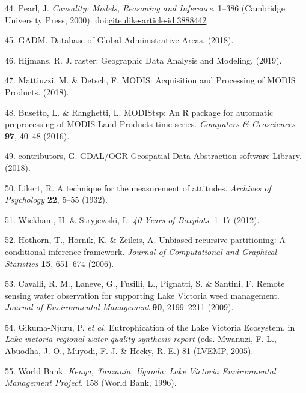 \documentclass[12pt,oneside]{article}
\begin{document}
\leavevmode\hypertarget{ref-Pearl_2000}{}%
44. Pearl, J. \emph{Causality: Models, Reasoning and Inference}. 1--386 (Cambridge University Press, 2000). doi:\href{https://doi.org/citeulike-article-id:3888442}{citeulike-article-id:3888442}

\leavevmode\hypertarget{ref-GADM_2018}{}%
45. GADM. Database of Global Administrative Areas. (2018).

\leavevmode\hypertarget{ref-Hijmans_2019}{}%
46. Hijmans, R. J. raster: Geographic Data Analysis and Modeling. (2019).

\leavevmode\hypertarget{ref-Mattiuzzi_and_Detsch_2018}{}%
47. Mattiuzzi, M. \& Detsch, F. MODIS: Acquisition and Processing of MODIS Products. (2018).

\leavevmode\hypertarget{ref-Busetto_and_ranghetti_2016}{}%
48. Busetto, L. \& Ranghetti, L. MODIStsp: An R package for automatic preprocessing of MODIS Land Products time series. \emph{Computers \& Geosciences} \textbf{97}, 40--48 (2016).

\leavevmode\hypertarget{ref-GDAL_OGRcontributors_2018}{}%
49. contributors, G. GDAL/OGR Geospatial Data Abstraction software Library. (2018).

\leavevmode\hypertarget{ref-Likert_1932}{}%
50. Likert, R. A technique for the measurement of attitudes. \emph{Archives of Psychology} \textbf{22}, 5--55 (1932).

\leavevmode\hypertarget{ref-Wickham_and_Stryjewski_2012}{}%
51. Wickham, H. \& Stryjewski, L. \emph{40 Years of Boxplots}. 1--17 (2012).

\leavevmode\hypertarget{ref-Hothorn_et_al_2006}{}%
52. Hothorn, T., Hornik, K. \& Zeileis, A. Unbiased recursive partitioning: A conditional inference framework. \emph{Journal of Computational and Graphical Statistics} \textbf{15}, 651--674 (2006).

\leavevmode\hypertarget{ref-Cavalli_et_al_2009}{}%
53. Cavalli, R. M., Laneve, G., Fusilli, L., Pignatti, S. \& Santini, F. Remote sensing water observation for supporting Lake Victoria weed management. \emph{Journal of Environmental Management} \textbf{90}, 2199--2211 (2009).

\leavevmode\hypertarget{ref-Gikuma-Njuru_et_al_2005}{}%
54. Gikuma-Njuru, P. \emph{et al.} Eutrophication of the Lake Victoria Ecosystem. in \emph{Lake victoria regional water quality synthesis report} (eds. Mwanuzi, F. L., Abuodha, J. O., Muyodi, F. J. \& Hecky, R. E.) 81 (LVEMP, 2005).

\leavevmode\hypertarget{ref-World_Bank_1996}{}%
55. World Bank. \emph{Kenya, Tanzania, Uganda: Lake Victoria Environmental Management Project}. 158 (World Bank, 1996).
\end{document}
